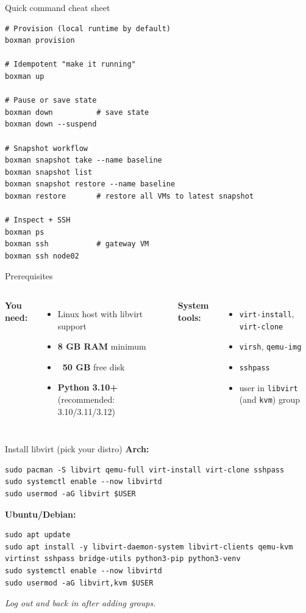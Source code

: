 \documentclass[aspectratio=169]{beamer}
\begin{document}
\begin{frame}[fragile]{Quick command cheat sheet}
\begin{lstlisting}[style=boxman]
# Provision (local runtime by default)
boxman provision

# Idempotent "make it running"
boxman up

# Pause or save state
boxman down          # save state
boxman down --suspend

# Snapshot workflow
boxman snapshot take --name baseline
boxman snapshot list
boxman snapshot restore --name baseline
boxman restore       # restore all VMs to latest snapshot

# Inspect + SSH
boxman ps
boxman ssh           # gateway VM
boxman ssh node02
\end{lstlisting}
\end{frame}

\begin{frame}[fragile]{Prerequisites}
\begin{columns}[T,onlytextwidth]
  \textbf{You need:}
  \begin{itemize}
    \item Linux host with libvirt support
    \item \textbf{8 GB RAM} minimum
    \item \textbf{~50 GB} free disk
    \item \textbf{Python 3.10+} (recommended: 3.10/3.11/3.12)
  \end{itemize}

  \textbf{System tools:}
  \begin{itemize}
    \item \texttt{virt-install}, \texttt{virt-clone}
    \item \texttt{virsh}, \texttt{qemu-img}
    \item \texttt{sshpass}
    \item user in \texttt{libvirt} (and \texttt{kvm}) group
  \end{itemize}
\end{columns}
\end{frame}

\begin{frame}[fragile]{Install libvirt (pick your distro)}
\textbf{Arch:}
\begin{lstlisting}[style=boxman]
sudo pacman -S libvirt qemu-full virt-install virt-clone sshpass
sudo systemctl enable --now libvirtd
sudo usermod -aG libvirt $USER
\end{lstlisting}

\textbf{Ubuntu/Debian:}
\begin{lstlisting}[style=boxman]
sudo apt update
sudo apt install -y libvirt-daemon-system libvirt-clients qemu-kvm virtinst sshpass bridge-utils python3-pip python3-venv
sudo systemctl enable --now libvirtd
sudo usermod -aG libvirt,kvm $USER
\end{lstlisting}
\vspace{0.5em}
\textit{Log out and back in after adding groups.}
\end{frame}
\end{document}
